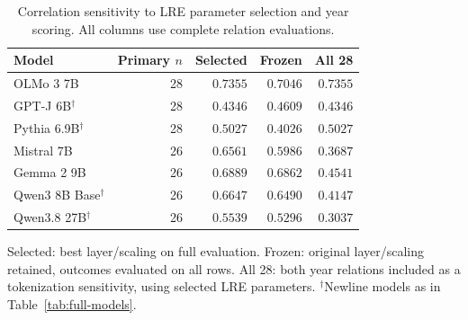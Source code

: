 \begin{table}[t]
\centering\small
\caption{Correlation sensitivity to LRE parameter selection and year scoring. All columns use complete relation evaluations.}
\label{tab:full-sensitivity}
\begin{tabular}{@{}lrrrr@{}}
\toprule
Model & Primary $n$ & Selected & Frozen & All 28 \\
\midrule
OLMo 3 7B & 28 & $0.7355$ & $0.7046$ & $0.7355$ \\
GPT-J 6B$^{\dagger}$ & 28 & $0.4346$ & $0.4609$ & $0.4346$ \\
Pythia 6.9B$^{\dagger}$ & 28 & $0.5027$ & $0.4026$ & $0.5027$ \\
Mistral 7B & 26 & $0.6561$ & $0.5986$ & $0.3687$ \\
Gemma 2 9B & 26 & $0.6889$ & $0.6862$ & $0.4541$ \\
Qwen3 8B Base$^{\dagger}$ & 26 & $0.6647$ & $0.6490$ & $0.4147$ \\
Qwen3.8 27B$^{\dagger}$ & 26 & $0.5539$ & $0.5296$ & $0.3037$ \\
\bottomrule
\end{tabular}
\par\smallskip\begin{minipage}{\linewidth}\footnotesize Selected: best layer/scaling on full evaluation. Frozen: original layer/scaling retained, outcomes evaluated on all rows. All 28: both year relations included as a tokenization sensitivity, using selected LRE parameters. $^{\dagger}$Newline models as in Table~\ref{tab:full-models}.\end{minipage}
\end{table}
